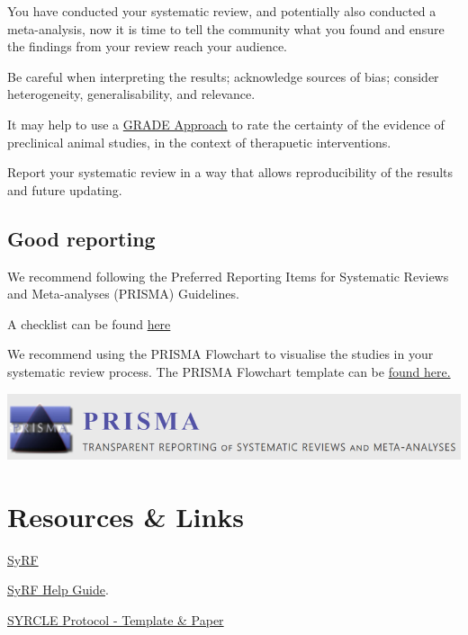 \documentclass[
]{book}
\begin{document}
You have conducted your systematic review, and potentially also conducted a meta-analysis, now it is time to tell the community what you found and ensure the findings from your review reach your audience.

Be careful when interpreting the results; acknowledge sources of bias; consider heterogeneity, generalisability, and relevance.

It may help to use a \href{https://journals.plos.org/plosone/article?id=10.1371/journal.pone.0187271}{GRADE Approach} to rate the certainty of the evidence of preclinical animal studies, in the context of therapuetic interventions.

Report your systematic review in a way that allows reproducibility of the results and future updating.

\hypertarget{good-reporting}{%
\section{Good reporting}\label{good-reporting}}

We recommend following the Preferred Reporting Items for Systematic Reviews and Meta-analyses (PRISMA) Guidelines.

A checklist can be found \href{http://www.prisma-statement.org/PRISMAStatement/Checklist}{here}

We recommend using the PRISMA Flowchart to visualise the studies in your systematic review process. The PRISMA Flowchart template can be \href{http://prisma-statement.org/prismastatement/flowdiagram}{found here.}

\includegraphics{figs/PRISMA.png}

\hypertarget{resources-links}{%
\chapter{Resources \& Links}\label{resources-links}}

\href{https://syrf.org.uk}{SyRF}

\href{https://assets.syrf.org.uk/guides/SyRF_User_Guide.pdf}{SyRF Help Guide}.

\href{https://onlinelibrary.wiley.com/doi/epdf/10.1002/ebm2.7}{SYRCLE Protocol - Template \& Paper}
\end{document}
